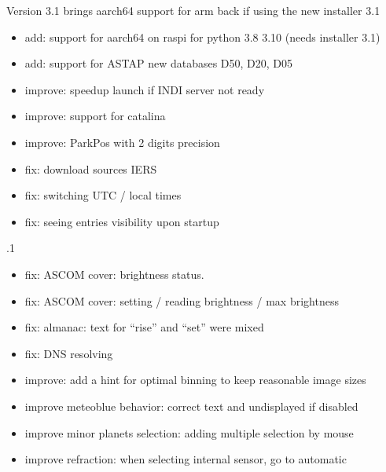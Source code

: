 \documentclass[a4paper,10pt,english]{sphinxmanual}
\begin{document}
\sphinxAtStartPar
Version 3.1 brings aarch64 support for arm back if using the new installer 3.1
\begin{itemize}
\item {} 
\sphinxAtStartPar
add: support for aarch64 on raspi for python 3.8 \sphinxhyphen{} 3.10 (needs installer 3.1)

\item {} 
\sphinxAtStartPar
add: support for ASTAP new databases D50, D20, D05

\item {} 
\sphinxAtStartPar
improve: speedup launch if INDI server not ready

\item {} 
\sphinxAtStartPar
improve: support for catalina

\item {} 
\sphinxAtStartPar
improve: ParkPos with 2 digits precision

\item {} 
\sphinxAtStartPar
fix: download sources IERS

\item {} 
\sphinxAtStartPar
fix: switching UTC / local times

\item {} 
\sphinxAtStartPar
fix: seeing entries visibility upon startup

\end{itemize}

.1
\begin{itemize}
\item {} 
\sphinxAtStartPar
fix: ASCOM cover: brightness status.

\item {} 
\sphinxAtStartPar
fix: ASCOM cover: setting / reading brightness / max brightness

\item {} 
\sphinxAtStartPar
fix: almanac: text for “rise” and “set” were mixed

\item {} 
\sphinxAtStartPar
fix: DNS resolving

\item {} 
\sphinxAtStartPar
improve: add a hint for optimal binning to keep reasonable image sizes

\item {} 
\sphinxAtStartPar
improve meteoblue behavior: correct text and undisplayed if disabled

\item {} 
\sphinxAtStartPar
improve minor planets selection: adding multiple selection by mouse

\item {} 
\sphinxAtStartPar
improve refraction: when selecting internal sensor, go to automatic

\end{itemize}
\end{document}
